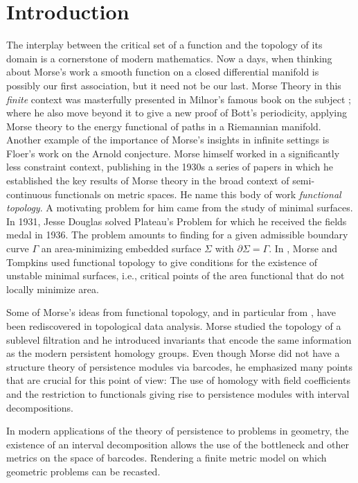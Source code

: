 
\section{Introduction}

The interplay between the critical set of a function and the topology of its domain is a cornerstone of modern mathematics.
Now a days, when thinking about Morse's work a smooth function on a closed differential manifold is possibly our first association, but it need not be our last.
Morse Theory in this \textit{finite} context was masterfully presented in Milnor's famous book on the subject \cite{MR0163331}; where he also move beyond it to give a new proof of Bott's periodicity, applying Morse theory to the energy functional of paths in a Riemannian manifold.
Another example of the importance of Morse's insights in infinite settings is Floer's work on the Arnold conjecture.
Morse himself worked in a significantly less constraint context, publishing in the 1930s a series of papers \cite{Morse.1937, Morse.1938, Morse.1940, MR9102} in which he established the key results of Morse theory in the broad context of semi-continuous functionals on metric spaces.
He name this body of work \textit{functional topology}.
A motivating problem for him came from the study of minimal surfaces.
In 1931, Jesse Douglas solved Plateau’s Problem \cite{Douglas.1931} for which he received the fields medal in 1936.
The problem amounts to finding for a given admissible boundary curve $\Gamma$ an area-minimizing embedded surface $\Sigma$ with $\partial \Sigma = \Gamma$.
In \cite{Morse.1939, Morse.1941}, Morse and Tompkins used functional topology to give conditions for the existence of unstable minimal surfaces, i.e., critical points of the area functional that do not locally minimize area.

Some of Morse's ideas from functional topology, and in particular from \cite{Morse.1940}, have been rediscovered in topological data analysis.
Morse studied the topology of a sublevel filtration and he introduced invariants that encode the same information as the modern persistent homology groups.
Even though Morse did not have a structure theory of persistence modules via barcodes, he emphasized many points that are crucial for this point of view:
The use of homology with field coefficients and the restriction to functionals giving rise to persistence modules with interval decompositions.

In modern applications of the theory of persistence to problems in geometry, the existence of an interval decomposition allows the use of the bottleneck and other metrics on the space of barcodes.
Rendering a finite metric model on which geometric problems can be recasted.

